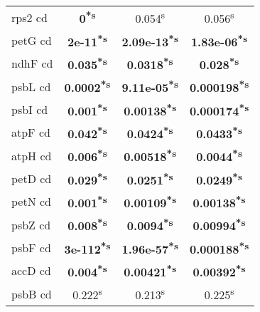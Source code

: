 \documentclass[a4paper]{article}
\begin{document}
\begin{longtable}{l|c|c|c}
rps2 cd&\textbf{0\textsuperscript{*}\textsuperscript{s}}&0.054\textsuperscript{s}&0.056\textsuperscript{s}\\
petG cd&\textbf{2e-11\textsuperscript{*}\textsuperscript{s}}&\textbf{2.09e-13\textsuperscript{*}\textsuperscript{s}}&\textbf{1.83e-06\textsuperscript{*}\textsuperscript{s}}\\
ndhF cd&\textbf{0.035\textsuperscript{*}\textsuperscript{s}}&\textbf{0.0318\textsuperscript{*}\textsuperscript{s}}&\textbf{0.028\textsuperscript{*}\textsuperscript{s}}\\
psbL cd&\textbf{0.0002\textsuperscript{*}\textsuperscript{s}}&\textbf{9.11e-05\textsuperscript{*}\textsuperscript{s}}&\textbf{0.000198\textsuperscript{*}\textsuperscript{s}}\\
psbI cd&\textbf{0.001\textsuperscript{*}\textsuperscript{s}}&\textbf{0.00138\textsuperscript{*}\textsuperscript{s}}&\textbf{0.000174\textsuperscript{*}\textsuperscript{s}}\\
atpF cd&\textbf{0.042\textsuperscript{*}\textsuperscript{s}}&\textbf{0.0424\textsuperscript{*}\textsuperscript{s}}&\textbf{0.0433\textsuperscript{*}\textsuperscript{s}}\\
atpH cd&\textbf{0.006\textsuperscript{*}\textsuperscript{s}}&\textbf{0.00518\textsuperscript{*}\textsuperscript{s}}&\textbf{0.0044\textsuperscript{*}\textsuperscript{s}}\\
petD cd&\textbf{0.029\textsuperscript{*}\textsuperscript{s}}&\textbf{0.0251\textsuperscript{*}\textsuperscript{s}}&\textbf{0.0249\textsuperscript{*}\textsuperscript{s}}\\
petN cd&\textbf{0.001\textsuperscript{*}\textsuperscript{s}}&\textbf{0.00109\textsuperscript{*}\textsuperscript{s}}&\textbf{0.00138\textsuperscript{*}\textsuperscript{s}}\\
psbZ cd&\textbf{0.008\textsuperscript{*}\textsuperscript{s}}&\textbf{0.0094\textsuperscript{*}\textsuperscript{s}}&\textbf{0.00994\textsuperscript{*}\textsuperscript{s}}\\
psbF cd&\textbf{3e-112\textsuperscript{*}\textsuperscript{s}}&\textbf{1.96e-57\textsuperscript{*}\textsuperscript{s}}&\textbf{0.000188\textsuperscript{*}\textsuperscript{s}}\\
accD cd&\textbf{0.004\textsuperscript{*}\textsuperscript{s}}&\textbf{0.00421\textsuperscript{*}\textsuperscript{s}}&\textbf{0.00392\textsuperscript{*}\textsuperscript{s}}\\
psbB cd&0.222\textsuperscript{s}&0.213\textsuperscript{s}&0.225\textsuperscript{s}\\

\end{longtable}
\end{document}
